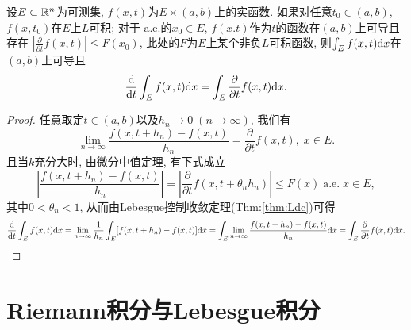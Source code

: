 \begin{theorem}[积分号下求导]
	设$E \subset \mathbb{R}^n$为可测集, $f(x, t)$为$E \times (a, b)$上的实函数. 
	如果对任意$t_0 \in (a, b)$, $f(x, t_0)$在$E$上$L$可积; 
	对于 a.e.的$x_0 \in E$, $f(x.t)$作为$t$的函数在$(a, b)$上可导且存在
	$\left| \frac{\partial}{\partial t} f(x, t) \right| \leq F(x_0)$, 
	此处的$F$为$E$上某个非负$L$可积函数, 则$\int_E f(x,t) \mathrm{d} x$在$(a,b)$上可导且
	\begin{equation}
		\frac{\mathrm{d}}{\mathrm{d} t} \int_E f(x, t) \mathrm{d} x = \int_E \frac{\partial}{\partial t} f(x, t) \mathrm{d} x.
	\end{equation}
\end{theorem}
\begin{proof}
	任意取定$t \in (a, b)$以及$h_n \to 0 \; (n \to \infty)$, 我们有
	$$
		\lim\limits_{n \to \infty} \frac{f(x, t+h_n) - f(x, t)}{h_n}
		= \frac{\partial}{\partial t} f(x, t), \; x\in E.
	$$
	且当$k$充分大时, 由微分中值定理, 有下式成立
	$$
		\left| \frac{f(x, t+h_n) - f(x, t)}{h_n} \right|
		= \left| \frac{\partial}{\partial t} f(x, t + \theta_n h_n ) \right|
		\leq F(x) \; \text{a.e.} \; x\in E,
	$$
	其中$0 < \theta_n <1$, 从而由Lebesgue控制收敛定理(Thm:\ref{thm:Ldc})可得
	$$
		\frac{\mathrm{d}}{\mathrm{d} t} \int_E f(x, t) \mathrm{d} x
		= \lim\limits_{n \to \infty} \frac{1}{h_n} \int_E [ f(x, t+h_n) - f(x, t) ] \mathrm{d} x
		= \int_E \lim\limits_{n \to \infty} \frac{f(x, t+h_n) - f(x, t)}{h_n} \mathrm{d} x
		= \int_E \frac{\partial}{\partial t} f(x, t) \mathrm{d} x.
	$$
\end{proof}
%
%
%	
%	
%
%
\section{Riemann积分与Lebesgue积分}

